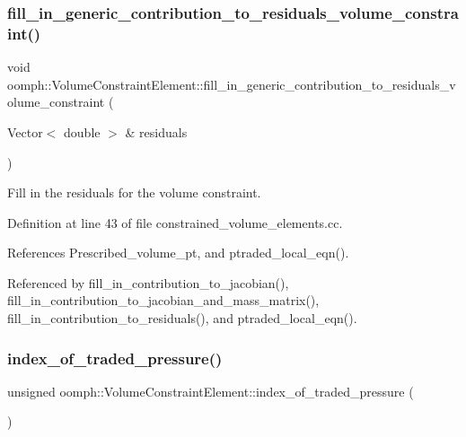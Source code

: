 \subsubsection{\texorpdfstring{fill\+\_\+in\+\_\+generic\+\_\+contribution\+\_\+to\+\_\+residuals\+\_\+volume\+\_\+constraint()}{fill\_in\_generic\_contribution\_to\_residuals\_volume\_constraint()}}
{\footnotesize\ttfamily void oomph\+::\+Volume\+Constraint\+Element\+::fill\+\_\+in\+\_\+generic\+\_\+contribution\+\_\+to\+\_\+residuals\+\_\+volume\+\_\+constraint (\begin{DoxyParamCaption}\item[{Vector$<$ double $>$ \&}]{residuals }\end{DoxyParamCaption})\hspace{0.3cm}{\ttfamily [private]}}



Fill in the residuals for the volume constraint. 



Definition at line 43 of file constrained\+\_\+volume\+\_\+elements.\+cc.



References Prescribed\+\_\+volume\+\_\+pt, and ptraded\+\_\+local\+\_\+eqn().



Referenced by fill\+\_\+in\+\_\+contribution\+\_\+to\+\_\+jacobian(), fill\+\_\+in\+\_\+contribution\+\_\+to\+\_\+jacobian\+\_\+and\+\_\+mass\+\_\+matrix(), fill\+\_\+in\+\_\+contribution\+\_\+to\+\_\+residuals(), and ptraded\+\_\+local\+\_\+eqn().

\mbox{\label{classoomph_1_1VolumeConstraintElement_ada831157effca052df0fae723c21c426}} 
\subsubsection{\texorpdfstring{index\+\_\+of\+\_\+traded\+\_\+pressure()}{index\_of\_traded\_pressure()}}
{\footnotesize\ttfamily unsigned oomph\+::\+Volume\+Constraint\+Element\+::index\+\_\+of\+\_\+traded\+\_\+pressure (\begin{DoxyParamCaption}{ }\end{DoxyParamCaption})\hspace{0.3cm}{\ttfamily [inline]}}



